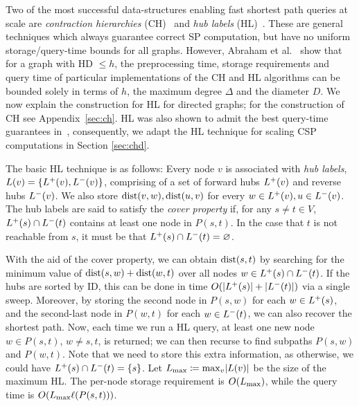 Two of the most successful data-structures enabling fast shortest path queries at scale are \emph{contraction hierarchies} (CH)~\cite{geisberger_ch_definition} and \emph{hub labels} (HL)~\cite{cohen_definition_hl}.
These are general techniques which always guarantee correct SP computation, but have no uniform storage/query-time bounds for all graphs.
However, Abraham et al.~\cite{highway2013} show that for a graph with HD $\leq h$, the preprocessing time, storage requirements and query time of particular implementations of the CH and HL algorithms can be bounded solely in terms of $h$, the maximum degree $\Delta$ and the diameter $D$. 
We now explain the construction for HL for directed graphs; for the construction of CH see Appendix~\ref{sec:ch}.
HL was also shown to admit the best query-time guarantees in~\cite{highway2013}, consequently, we adapt the HL technique for scaling CSP computations in Section \ref{sec:chd}.

The basic HL technique is as follows:
Every node $v$ is associated with \emph{hub labels}, $L(v) = \crl*{\Lf(v),\Lb(v)}$, comprising of a set of forward hubs $\Lf(v)$ and reverse hubs $\Lb(v)$.
We also store $\dist(v,w),\dist(u,v)$ for every $w\in\Lf(v),u\in\Lb(v)$.
The hub labels are said to satisfy the \emph{cover property} if, for any $s\neq t\in V$, $\Lf(s)\cap\Lb(t)$ contains at least one node in $P(s,t)$.
In the case that $t$ is not reachable from $s$, it must be that $\Lf(s)\cap\Lb(t)=\varnothing$.

With the aid of the cover property, we can obtain $\dist(s,t)$ by searching for the minimum value of $\dist(s,w)+\dist(w,t)$ over all nodes $w\in\Lf(s)\cap\Lb(t)$.
If the hubs are sorted by ID, this can be done in time $\Or(\card{\Lf(s)}+\card{\Lb(t)})$ via a single sweep.
Moreover, by storing the second node in $P(s,w)$ for each $w\in \Lf(s)$, and the second-last node in $P(w,t)$ for each $w\in \Lb(t)$, we can also recover the shortest path.
Now, each time we run a HL query, at least one new node $w\in P(s,t)$, $w\neq s,t$, is returned; we can then recurse to find subpaths $P(s,w)$ and $P(w,t)$.
Note that we need to store this extra information, as otherwise, we could have $\Lf(s)\cap\Lb(t)=\{s\}$.
Let $\Lm \defeq \max_v\abs*{L(v)}$ be the size of the maximum HL.
The per-node storage requirement is $\Or(\Lm)$, while the query time is $\Or(\Lm\ell(P(s,t)))$.


